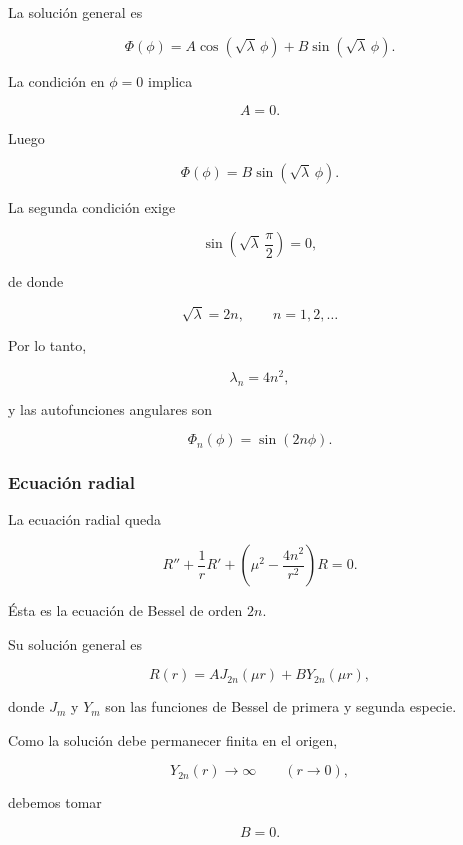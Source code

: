 \documentclass[12pt]{article}
\begin{document}
La solución general es

\[
\Phi(\phi)=
A\cos(\sqrt{\lambda}\,\phi)
+
B\sin(\sqrt{\lambda}\,\phi).
\]

La condición en $\phi=0$ implica

\[
A=0.
\]

Luego

\[
\Phi(\phi)=
B\sin(\sqrt{\lambda}\,\phi).
\]

La segunda condición exige

\[
\sin\!\left(
\sqrt{\lambda}\,
\frac{\pi}{2}
\right)=0,
\]

de donde

\begin{equation}
\sqrt{\lambda}=2n,
\qquad
n=1,2,\ldots
\end{equation}

Por lo tanto,

\begin{equation}
\lambda_n=4n^2,
\end{equation}

y las autofunciones angulares son

\begin{equation}
\Phi_n(\phi)=\sin(2n\phi).
\end{equation}

\subsubsection*{Ecuación radial}

La ecuación radial queda

\begin{equation}
R''+\frac1rR'
+\left(
\mu^2-\frac{4n^2}{r^2}
\right)R=0.
\end{equation}

Ésta es la ecuación de Bessel de orden $2n$.

Su solución general es

\begin{equation}
R(r)=
AJ_{2n}(\mu r)
+
BY_{2n}(\mu r),
\end{equation}

donde $J_m$ y $Y_m$ son las funciones de Bessel de primera y segunda especie.

Como la solución debe permanecer finita en el origen,

\[
Y_{2n}(r)\rightarrow\infty
\qquad
(r\rightarrow0),
\]

debemos tomar

\[
B=0.
\]
\end{document}

